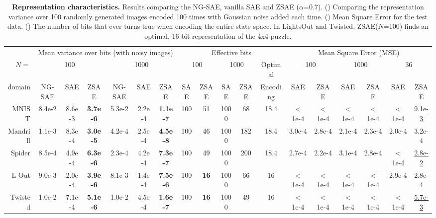 \begin{table}[tbp]
 \centering
 \begin{adjustbox}{width={\linewidth},keepaspectratio}
 \begin{tabular}{|r|*{17}{c|}}
       & \multicolumn{6}{c|}{Mean variance over bits (with noisy images)}
       & \multicolumn{5}{c|}{Effective bits}
       & \multicolumn{6}{c|}{Mean Square Error (MSE)}
  \\
$N=$ & \multicolumn{3}{c|}{100} & \multicolumn{3}{c|}{1000}
     & \multicolumn{2}{c|}{100} & \multicolumn{2}{c|}{1000}
     & Optimal
     & \multicolumn{2}{c|}{100} & \multicolumn{2}{c|}{1000} & \multicolumn{2}{c|}{36}
  \\
domain    & NG-SAE & SAE    & ZSAE            & NG-SAE & SAE    & ZSAE            & SAE & ZSAE        & SAE  & ZSAE & Encoding & SAE     & ZSAE   & SAE    & ZSAE   & SAE    & ZSAE           \\ 
MNIST     & 8.4e-2 & 8.6e-3 & \textbf{3.7e-6} & 5.3e-2 & 2.2e-4 & \textbf{1.1e-7} & 100 & 51          & 1000 & 68   & 18.4     & $<$1e-4 &$<$1e-4 &$<$1e-4 &$<$1e-4 &$<$1e-4 &\uline{9.1e-3}  \\ 
Mandrill  & 1.1e-3 & 8.3e-4 & \textbf{3.0e-5} & 4.2e-4 & 2.5e-4 & \textbf{4.5e-8} & 100 & 46          & 1000 & 182  & 18.4     & 3.0e-4  &2.8e-4  &2.1e-4  &2.3e-4  &2.0e-4  &{3.2e-4}        \\ 
Spider    & 8.5e-4 & 4.9e-4 & \textbf{6.3e-6} & 2.3e-4 & 4.2e-4 & \textbf{7.3e-7} & 100 & 49          & 1000 & 200  & 18.4     & 2.7e-4  &2.2e-4  &3.1e-4  &2.8e-4  &$<$1e-4 &\uline{2.8e-2}  \\ 
L-Out     & 9.0e-3 & 2.0e-4 & \textbf{3.9e-6} & 8.1e-3 & 1.4e-4 & \textbf{7.5e-6} & 100 & \textbf{16} & 1000 & 66   & 16       & $<$1e-4 &$<$1e-4 &$<$1e-4 &$<$1e-4 &2.9e-4  &{2.8e-4}        \\ 
Twisted   & 1.0e-2 & 7.1e-4 & \textbf{5.1e-6} & 1.0e-2 & 4.5e-4 & \textbf{1.6e-7} & 100 & \textbf{16} & 1000 & 49   & 16       & $<$1e-4 &$<$1e-4 &$<$1e-4 &$<$1e-4 &$<$1e-4 &\uline{5.7e-3}  \\ 
\end{tabular}
\end{adjustbox}
 \caption{\textbf{Representation characteristics.}
Results comparing the NG-SAE, vanilla SAE and ZSAE ($\alpha$=0.7).
() Comparing the representation variance over 100 randomly generated images encoded 100 times with Gaussian noise added each time.
() Mean Square Error for the test data.
() The number of bits that ever turns true when encoding the entire state space.
 In LightsOut and Twisted, ZSAE($N$=100) finds an optimal, 16-bit representation of the 4x4 puzzle.
 }
\label{tab:stability}
\end{table}

